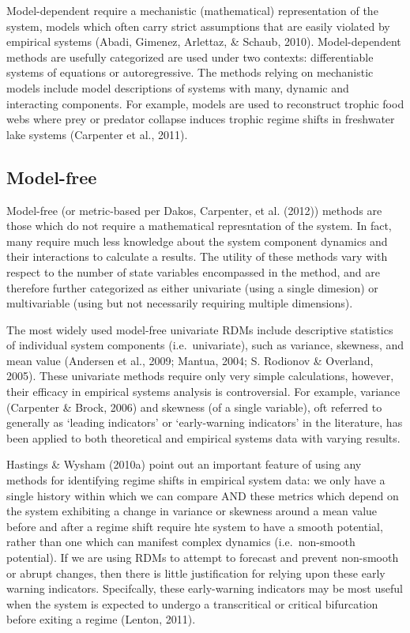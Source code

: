 \documentclass[12pt,twoside,openany]{reedthesis}
\begin{document}
Model-dependent require a mechanistic (mathematical) representation of the system, models which often carry strict assumptions that are easily violated by empirical systems (Abadi, Gimenez, Arlettaz, \& Schaub, 2010). Model-dependent methods are usefully categorized are used under two contexts: differentiable systems of equations or autoregressive. The methods relying on mechanistic models include model descriptions of systems with many, dynamic and interacting components. For example, models are used to reconstruct trophic food webs where prey or predator collapse induces trophic regime shifts in freshwater lake systems (Carpenter et al., 2011).

\hypertarget{model-free}{%
\subsection{Model-free}\label{model-free}}

Model-free (or metric-based per Dakos, Carpenter, et al. (2012)) methods are those which do not require a mathematical represntation of the system. In fact, many require much less knowledge about the system component dynamics and their interactions to calculate a results. The utility of these methods vary with respect to the number of state variables encompassed in the method, and are therefore further categorized as either univariate (using a single dimesion) or multivariable (using but not necessarily requiring multiple dimensions).

The most widely used model-free univariate RDMs include descriptive statistics of individual system components (i.e.~univariate), such as variance, skewness, and mean value (Andersen et al., 2009; Mantua, 2004; S. Rodionov \& Overland, 2005). These univariate methods require only very simple calculations, however, their efficacy in empirical systems analysis is controversial. For example, variance (Carpenter \& Brock, 2006) and skewness (of a single variable), oft referred to generally as `leading indicators' or `early-warning indicators' in the literature, has been applied to both theoretical and empirical systems data with varying results.

Hastings \& Wysham (2010a) point out an important feature of using any methods for identifying regime shifts in empirical system data: we only have a single history within which we can compare AND these metrics which depend on the system exhibiting a change in variance or skewness around a mean value before and after a regime shift require hte system to have a smooth potential, rather than one which can manifest complex dynamics (i.e.~non-smooth potential). If we are using RDMs to attempt to forecast and prevent non-smooth or abrupt changes, then there is little justification for relying upon these early warning indicators. Specifcally, these early-warning indicators may be most useful when the system is expected to undergo a transcritical or critical bifurcation before exiting a regime (Lenton, 2011).
\end{document}
